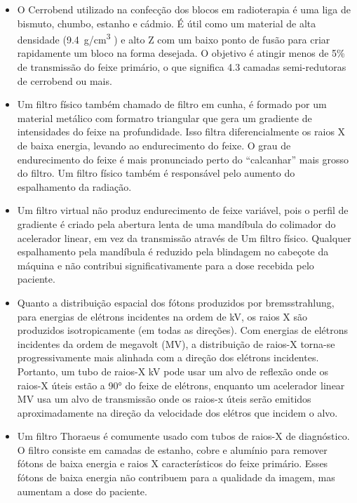 \documentclass[11pt,a4paper]{article}
\newcounter{exemplo}
\begin{document}
\begin{exemplo}
\begin{itemize}
        \item O Cerrobend utilizado na confecção dos blocos em radioterapia é uma liga de bismuto, chumbo, estanho e cádmio. É útil como um material de alta densidade (\qty{9.4}{g/cm^3} ) e alto Z com um baixo ponto de fusão para criar rapidamente um bloco na forma desejada. O objetivo é atingir menos de 5\% de transmissão do feixe primário, o que significa 4.3 camadas semi-redutoras de cerrobend ou mais. 
        
        \item Um filtro físico também chamado de filtro em cunha, é formado por um material metálico com formatro triangular que gera um gradiente de intensidades do feixe na profundidade. Isso filtra diferencialmente os raios X de baixa energia, levando ao endurecimento do feixe. O grau de endurecimento do feixe é mais pronunciado perto do “calcanhar” mais grosso do filtro. Um filtro físico também é responsável pelo aumento do espalhamento da radiação.
        
        \item Um filtro virtual não produz endurecimento de feixe variável, pois o perfil de gradiente é criado pela abertura lenta de uma mandíbula do colimador do acelerador linear, em vez da transmissão através de Um filtro físico. Qualquer espalhamento pela mandíbula é reduzido pela blindagem no cabeçote da máquina e não contribui significativamente para a dose recebida pelo paciente.
        
        \item Quanto a distribuição espacial dos fótons produzidos por bremsstrahlung, para energias de elétrons incidentes na ordem de kV, os raios X são produzidos isotropicamente (em todas as direções). Com energias de elétrons incidentes da ordem de megavolt (MV), a distribuição de raios-X torna-se progressivamente mais alinhada com a direção dos elétrons incidentes. Portanto, um tubo de raios-X kV pode usar um alvo de reflexão onde os raios-X úteis estão a 90° do feixe de elétrons, enquanto um acelerador linear MV usa um alvo de transmissão onde os raios-x úteis serão emitidos aproximadamente na direção da velocidade dos elétros que incidem o alvo.

        \item Um filtro Thoraeus é comumente usado com tubos de raios-X de diagnóstico. O filtro consiste em camadas de estanho, cobre e alumínio para remover fótons de baixa energia e raios X característicos do feixe primário. Esses fótons de baixa energia não contribuem para a qualidade da imagem, mas aumentam a dose do paciente.
        

\end{itemize}
\end{exemplo}
\end{document}
